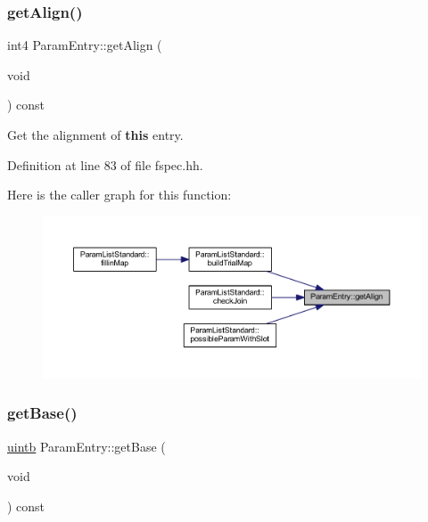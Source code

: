 \subsubsection{\texorpdfstring{getAlign()}{getAlign()}}
{\footnotesize\ttfamily int4 Param\+Entry\+::get\+Align (\begin{DoxyParamCaption}\item[{void}]{ }\end{DoxyParamCaption}) const\hspace{0.3cm}{\ttfamily [inline]}}



Get the alignment of {\bfseries{this}} entry. 



Definition at line 83 of file fspec.\+hh.

Here is the caller graph for this function\+:
\nopagebreak
\begin{figure}[H]
\begin{center}
\leavevmode
\includegraphics[width=350pt]{class_param_entry_a7366c85d2d63bc5a2495d8597b1f977a_icgraph}
\end{center}
\end{figure}
\mbox{\label{class_param_entry_addf545facfb18d6e4f4a0ae3aea203a8}} 
\subsubsection{\texorpdfstring{getBase()}{getBase()}}
{\footnotesize\ttfamily \mbox{\hyperlink{types_8h_a2db313c5d32a12b01d26ac9b3bca178f}{uintb}} Param\+Entry\+::get\+Base (\begin{DoxyParamCaption}\item[{void}]{ }\end{DoxyParamCaption}) const\hspace{0.3cm}{\ttfamily [inline]}}




